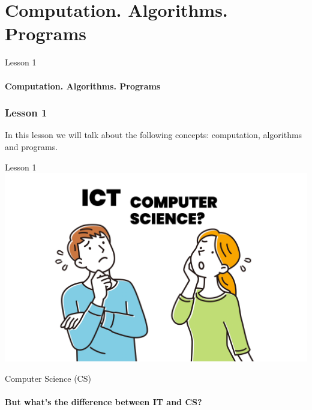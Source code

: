 \documentclass[aspectratio=1610]{beamer}
\begin{document}
\section{Computation. Algorithms. Programs}

\begin{frame}
\begin{center}
\Huge Lesson 1\\~\\
\textbf{Computation. Algorithms. Programs}
\end{center}
\end{frame}


\begin{frame}
\frametitle{Lesson 1}

\Huge In this lesson we will talk about the following concepts:
 \alert{computation},
 \alert{algorithms} and
 \alert{programs}. 

\end{frame}


\begin{frame}{Lesson 1}{}
\includegraphics[scale=0.149]{Images/ictvscs.png}
\end{frame}


\begin{frame}
\begin{center}
\Huge Computer Science (CS)\\~\\
\textbf { But what's the difference between IT and CS? }
\end{center}
\end{frame}
\end{document}
